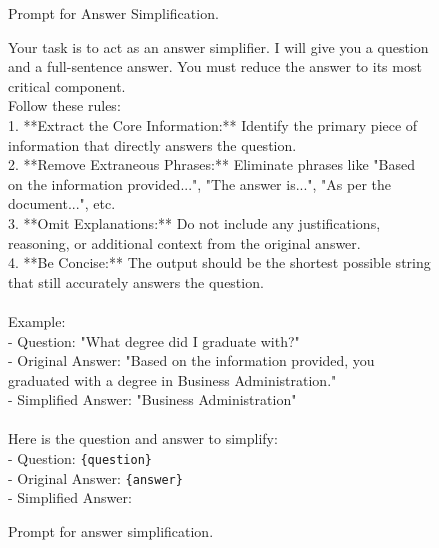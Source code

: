 \begin{figure}[h]
\centering
\setlength{\abovecaptionskip}{0cm}
\begin{AIbox}{Prompt for Answer Simplification.}
{
\begin{tcolorbox}[colback=gray!10, colframe=gray!10, boxrule=0pt, sharp corners, left=0pt, right=0pt]
Your task is to act as an answer simplifier. I will give you a question and a full-sentence answer. You must reduce the answer to its most critical component.\\
Follow these rules:\\
1.  **Extract the Core Information:** Identify the primary piece of information that directly answers the question.\\
2.  **Remove Extraneous Phrases:** Eliminate phrases like "Based on the information provided...", "The answer is...", "As per the document...", etc.\\
3.  **Omit Explanations:** Do not include any justifications, reasoning, or additional context from the original answer.\\
4.  **Be Concise:** The output should be the shortest possible string that still accurately answers the question.\\
\\
Example:\\
- Question: "What degree did I graduate with?"\\
- Original Answer: "Based on the information provided, you graduated with a degree in Business Administration."\\
- Simplified Answer: "Business Administration"\\
    \\
Here is the question and answer to simplify:\\
- Question: \texttt{\{question\}}\\
- Original Answer: \texttt{\{answer\}}\\
- Simplified Answer:
\end{tcolorbox}
}
\end{AIbox} 
\caption{Prompt for answer simplification.}
\label{fig:pmt:simplify}
\end{figure}



